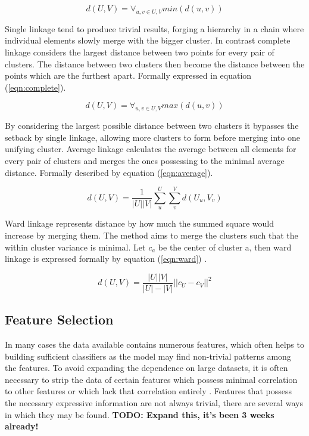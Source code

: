 \begin{equation}
\label{eqn:single}
d(U, V) = \forall_{u, v \in U, V} min(d(u, v))
\end{equation}

Single linkage tend to produce trivial results, forging a hierarchy in a chain where individual elements slowly merge with the bigger cluster. In contrast complete linkage considers the largest distance between two points for every pair of clusters. The distance between two clusters then become the distance between the points which are the furthest apart. Formally expressed in equation (\ref{eqn:complete}).

\begin{equation}
\label{eqn:complete}
d(U, V) = \forall_{u, v \in U, V} max(d(u, v))
\end{equation}

By considering the largest possible distance between two clusters it bypasses the setback by single linkage, allowing more clusters to form before merging into one unifying cluster. Average linkage calculates the average between all elements for every pair of clusters and merges the ones possessing to the minimal average distance. Formally described by equation (\ref{eqn:average}).

\begin{equation}
\label{eqn:average}
d(U, V) = \frac{1}{|U||V|}\sum\limits_u^U \sum\limits_v^V  d(U_u, V_v)
\end{equation}

Ward linkage represents distance by how much the summed square would increase by merging them. The method aims to merge the clusters such that the within cluster variance is minimal. Let $c_a$ be the center of cluster a, then ward linkage is expressed formally by equation (\ref{eqn:ward}) \cite{shalizi2009distances}.


\begin{equation}
\label{eqn:ward}
d(U, V) = \frac{|U||V|}{|U|-|V|}||c_U - c_V||^2
\end{equation}



\subsection{Feature Selection}

In many cases the data available contains numerous features, which often helps to building sufficient classifiers as the model may find non-trivial patterns among the features. To avoid expanding the dependence on large datasets, it is often necessary to strip the data of certain features which possess minimal correlation to other features or which lack that correlation entirely \cite{dash1997feature}. Features that possess the necessary expressive information are not always trivial, there are several ways in which they may be found. \textbf{TODO: Expand this, it's been 3 weeks already!}

